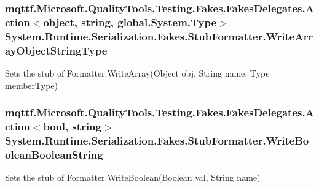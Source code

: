 \hypertarget{class_system_1_1_runtime_1_1_serialization_1_1_fakes_1_1_stub_formatter_a3c6918a6ce3cfca9c7e43ae75e4fe690}{
\subsubsection[{Write\-Array\-Object\-String\-Type}]{\setlength{\rightskip}{0pt plus 5cm}mqttf.\-Microsoft.\-Quality\-Tools.\-Testing.\-Fakes.\-Fakes\-Delegates.\-Action$<$object, string, global.\-System.\-Type$>$ System.\-Runtime.\-Serialization.\-Fakes.\-Stub\-Formatter.\-Write\-Array\-Object\-String\-Type}}\label{class_system_1_1_runtime_1_1_serialization_1_1_fakes_1_1_stub_formatter_a3c6918a6ce3cfca9c7e43ae75e4fe690}


Sets the stub of Formatter.\-Write\-Array(\-Object obj, String name, Type member\-Type)

\hypertarget{class_system_1_1_runtime_1_1_serialization_1_1_fakes_1_1_stub_formatter_a35da7f8977b95f1f8a3556891333e4c7}{
\subsubsection[{Write\-Boolean\-Boolean\-String}]{\setlength{\rightskip}{0pt plus 5cm}mqttf.\-Microsoft.\-Quality\-Tools.\-Testing.\-Fakes.\-Fakes\-Delegates.\-Action$<$bool, string$>$ System.\-Runtime.\-Serialization.\-Fakes.\-Stub\-Formatter.\-Write\-Boolean\-Boolean\-String}}\label{class_system_1_1_runtime_1_1_serialization_1_1_fakes_1_1_stub_formatter_a35da7f8977b95f1f8a3556891333e4c7}


Sets the stub of Formatter.\-Write\-Boolean(\-Boolean val, String name)

